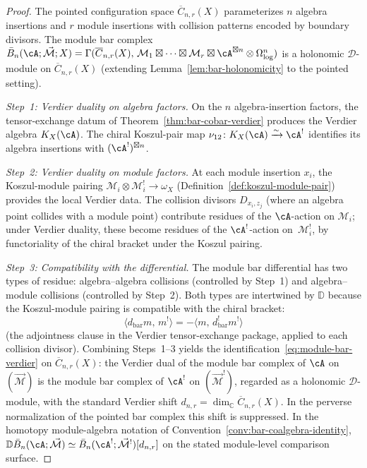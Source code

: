 \begin{proof}
The pointed configuration space $\overline{C}_{n,r}(X)$
parameterizes $n$ algebra insertions and $r$ module insertions
with collision patterns encoded by boundary divisors. The module
bar complex
$\bar{B}_n(\cA; \vec{\mathcal{M}}; X)
= \Gamma(\overline{C}_{n,r}(X),\,
\mathcal{M}_1 \boxtimes \cdots \boxtimes \mathcal{M}_r
\boxtimes \cA^{\boxtimes n} \otimes \Omega^n_{\log})$
is a holonomic $\mathcal{D}$-module on $\overline{C}_{n,r}(X)$
(extending Lemma~\ref{lem:bar-holonomicity} to the pointed
setting).

\emph{Step~1: Verdier duality on algebra factors.}
On the $n$ algebra-insertion factors, the tensor-exchange datum of
Theorem~\ref{thm:bar-cobar-verdier} produces the Verdier algebra
$K_X(\cA)$.  The chiral Koszul-pair map
$\nu_{12}\colon K_X(\cA)\xrightarrow{\sim}\cA^!$ identifies its
algebra insertions with $(\cA^!)^{\boxtimes n}$.

\emph{Step~2: Verdier duality on module factors.}
At each module insertion $x_i$, the Koszul-module pairing
$\mathcal{M}_i \otimes \mathcal{M}_i^! \to \omega_X$
(Definition~\ref{def:koszul-module-pair}) provides the local
Verdier data. The collision divisors $D_{x_i, z_j}$ (where an
algebra point collides with a module point) contribute residues of
the $\cA$-action on $\mathcal{M}_i$; under Verdier duality, these
become residues of the $\cA^!$-action on~$\mathcal{M}_i^!$, by
functoriality of the chiral bracket under the Koszul pairing.

\emph{Step~3: Compatibility with the differential.}
The module bar differential has two types of residue:
algebra--algebra collisions (controlled by Step~1) and
algebra--module collisions (controlled by Step~2). Both types
are intertwined by $\mathbb{D}$ because the Koszul-module
pairing is compatible with the chiral bracket:
\[
\langle d_{\mathrm{bar}} m,\, m^! \rangle
= - \langle m,\, d_{\mathrm{bar}}^! m^! \rangle
\]
(the adjointness clause in the Verdier tensor-exchange package,
applied to each collision divisor). Combining Steps~1--3 yields the
identification~\eqref{eq:module-bar-verdier} on $\overline{C}_{n,r}(X)$:
the Verdier dual of the module bar complex of $\cA$ on
$(\vec{\mathcal{M}})$ is the module bar complex of $\cA^!$ on
$(\vec{\mathcal{M}}^!)$, regarded as a holonomic
$\mathcal{D}$-module, with the standard Verdier shift
$d_{n,r}=\dim_{\mathbb C}\overline{C}_{n,r}(X)$. In the perverse
normalization of the pointed bar complex this shift is suppressed.
In the homotopy module-algebra notation of
Convention~\ref{conv:bar-coalgebra-identity},
$\mathbb{D}\bar{B}_n(\cA; \vec{\mathcal{M}})
\simeq \bar{B}_n(\cA^!; \vec{\mathcal{M}}^!)[d_{n,r}]$ on the
stated module-level comparison surface.


\end{proof}
